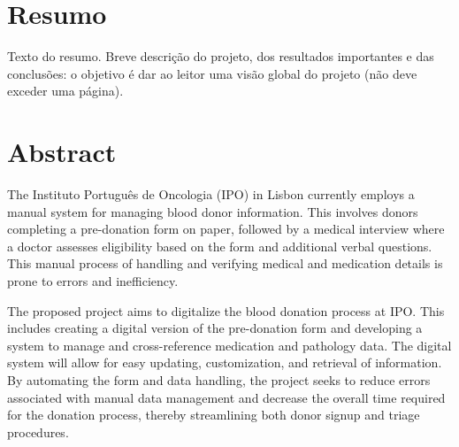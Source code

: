 \documentclass[a4paper,openright,twoside,11pt]{report}
\begin{document}
\cleardoublepage
\chapter*{Resumo}
Texto do resumo.
Breve descrição do projeto, dos resultados importantes e das conclusões: o objetivo é dar ao leitor uma visão global do projeto (não deve exceder uma página).

\cleardoublepage
\chapter*{Abstract}
The Instituto Português de Oncologia (IPO) in Lisbon currently employs a manual system for managing blood donor information. This involves donors completing a pre-donation form on paper, followed by a medical interview where a doctor assesses eligibility based on the form and additional verbal questions. This manual process of handling and verifying medical and medication details is prone to errors and inefficiency.

The proposed project aims to digitalize the blood donation process at IPO. This includes creating a digital version of the pre-donation form and developing a system to manage and cross-reference medication and pathology data. The digital system will allow for easy updating, customization, and retrieval of information. By automating the form and data handling, the project seeks to reduce errors associated with manual data management and decrease the overall time required for the donation process, thereby streamlining both donor signup and triage procedures.



\cleardoublepage
\tableofcontents \cleardoublepage


\setcounter{page}{1}














\appendix

\end{document}
